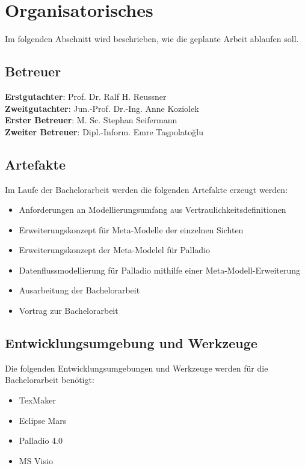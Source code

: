 
\chapter{Organisatorisches}
\label{ch:Organisatorisches}
Im folgenden Abschnitt wird beschrieben, wie die geplante Arbeit ablaufen soll.
\section{Betreuer}
\textbf{Erstgutachter}: Prof. Dr. Ralf H. Reussner \\
\textbf{Zweitgutachter}: Jun.-Prof. Dr.-Ing. Anne Koziolek \\
\textbf{Erster Betreuer}: M. Sc. Stephan Seifermann \\
\textbf{Zweiter Betreuer}: Dipl.-Inform. Emre Taşpolatoğlu 

\section{Artefakte}
Im Laufe der Bachelorarbeit werden die folgenden Artefakte erzeugt werden:
\begin{itemize}
\item Anforderungen an Modellierungsumfang aus Vertraulichkeitsdefinitionen
\item Erweiterungskonzept für Meta-Modelle der einzelnen Sichten 
\item Erweiterungskonzept der Meta-Modelel für Palladio 
\item Datenflussmodellierung für Palladio mithilfe einer Meta-Modell-Erweiterung  
\item Ausarbeitung der Bachelorarbeit 
\item Vortrag zur Bachelorarbeit
\end{itemize}

\section{Entwicklungsumgebung und Werkzeuge}
Die folgenden Entwicklungsumgebungen und Werkzeuge werden für die Bachelorarbeit benötigt:
\begin{itemize}
\item TexMaker
\item Eclipse Mars
\item Palladio 4.0
\item MS Visio
\end{itemize}